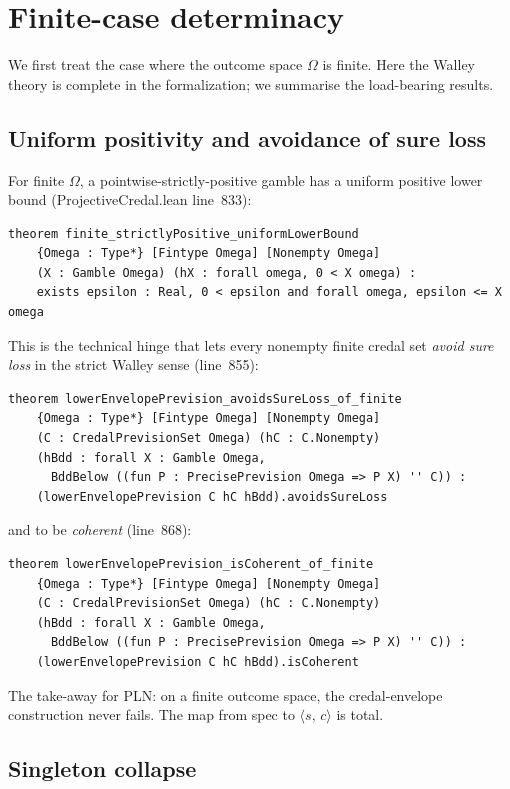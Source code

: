 \documentclass[]{article}
\newcommand{\STV}[2]{\langle #1,\, #2 \rangle}
\begin{document}
\section{Finite-case determinacy}\label{sec:finite}

We first treat the case where the outcome space $\Omega$ is finite. Here
the Walley theory is complete in the formalization; we summarise the
load-bearing results.

\subsection{Uniform positivity and avoidance of sure loss}

For finite $\Omega$, a pointwise-strictly-positive gamble has a uniform
positive lower bound (ProjectiveCredal.lean line~833):
\begin{lstlisting}
theorem finite_strictlyPositive_uniformLowerBound
    {Omega : Type*} [Fintype Omega] [Nonempty Omega]
    (X : Gamble Omega) (hX : forall omega, 0 < X omega) :
    exists epsilon : Real, 0 < epsilon and forall omega, epsilon <= X omega
\end{lstlisting}
This is the technical hinge that lets every nonempty finite credal set
\emph{avoid sure loss} in the strict Walley sense
(line~855):
\begin{lstlisting}
theorem lowerEnvelopePrevision_avoidsSureLoss_of_finite
    {Omega : Type*} [Fintype Omega] [Nonempty Omega]
    (C : CredalPrevisionSet Omega) (hC : C.Nonempty)
    (hBdd : forall X : Gamble Omega,
      BddBelow ((fun P : PrecisePrevision Omega => P X) '' C)) :
    (lowerEnvelopePrevision C hC hBdd).avoidsSureLoss
\end{lstlisting}
and to be \emph{coherent} (line~868):
\begin{lstlisting}
theorem lowerEnvelopePrevision_isCoherent_of_finite
    {Omega : Type*} [Fintype Omega] [Nonempty Omega]
    (C : CredalPrevisionSet Omega) (hC : C.Nonempty)
    (hBdd : forall X : Gamble Omega,
      BddBelow ((fun P : PrecisePrevision Omega => P X) '' C)) :
    (lowerEnvelopePrevision C hC hBdd).isCoherent
\end{lstlisting}
The take-away for PLN: on a finite outcome space, the credal-envelope
construction never fails. The map from spec to $\STV{s}{c}$ is total.

\subsection{Singleton collapse}
\end{document}
